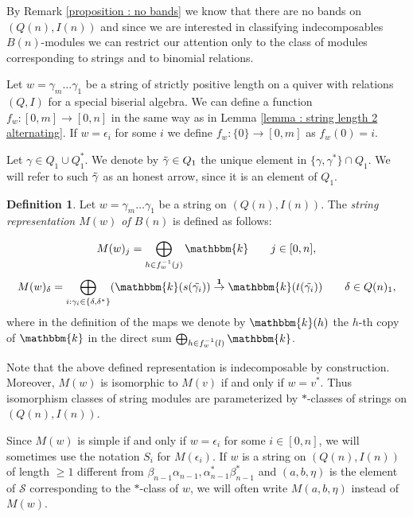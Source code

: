 \documentclass[11pt]{amsart}
\theoremstyle{definition}
\newtheorem{definition}[theorem]{Definition}
\newcommand{\kk}{\mathbbm{k}}
\newcommand{\martina}[1]{\textcolor{blue}{$[\star$ Martina: #1 $\star]$}}
\begin{document}
By Remark \ref{proposition : no bands} we know that there are no bands on $(Q(n), I(n))$ and since we are interested in classifying indecomposables $B(n)$-modules we can restrict our attention only to the class of modules corresponding to strings and to binomial relations. 

Let $w=\gamma_m\ldots \gamma_1$ be a string of strictly positive length on a quiver with relations $(Q,I)$ for a special biserial algebra. We can define a function $f_w:[0,m]\rightarrow [0,n]$ in the same way as in Lemma \ref{lemma : string length 2 alternating}. If $w=\epsilon_i$ for some $i$ we define $f_w:\{0\}\to [0,m]$ as $f_w(0)=i$.

Let $\gamma\in Q_1\cup Q_1^*$. We denote by $\Tilde{\gamma}\in Q_1$ the unique element in $\{\gamma,\gamma^*\}\cap Q_1$. We will refer to such $\Tilde{\gamma}$ as an  honest arrow, since it is an element of $Q_1$.

\begin{definition}\cite[\S2]{WW}  Let $w=\gamma_m\ldots\gamma_1$ be a string on $(Q(n), I(n))$. The \emph{string representation $M(w)$ of $B(n)$} is defined as follows: 

       \[
     M(w)_j=\bigoplus_{h\in f_w^{-1}(j)} \kk
    \qquad  j\in [0,n], 
    \]
    \[
    M(w)_\delta=      
    \bigoplus_{i:\gamma_i\in\{\delta, \delta^*\}}(\kk(s(\Tilde{\gamma_i}))\stackrel{\bf 1}{\rightarrow} \kk(t(\Tilde{\gamma_i}))
    \qquad \delta\in Q(n)_1 ,
    \]
    where in the definition of the maps we denote by $\kk(h)$ the $h$-th copy of $\kk$ in the direct sum $\bigoplus_{h\in f_w^{-1}(l)} \kk$.
\end{definition}

Note that the above defined representation is indecomposable by construction. Moreover, $M(w)$ is isomorphic to $M(v)$ if and only if $w=v^*$. Thus isomorphism classes of string modules are parameterized by $*$-classes of strings on $(Q(n), I(n))$.

Since $M(w)$ is simple if and only if $w=\epsilon_i$ for some $i\in [0,n]$, we will sometimes use the notation $S_i$ for $M(\epsilon_i)$. If $w$ is a string on $(Q(n), I(n))$ of length $\geq 1$ different from $\beta_{n-1}\alpha_{n-1}, \alpha_{n-1}^* \beta_{n-1}^*$ and $(a,b,\eta)$ is the element of $\mathscr{S}$ corresponding to the $*$-class of $w$, we will often write $M(a,b,\eta)$ instead of $M(w)$.
\end{document}
